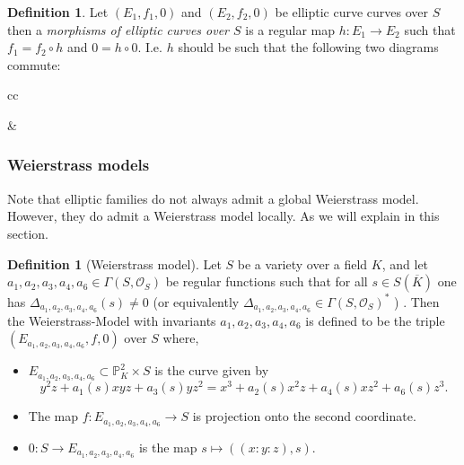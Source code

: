 \documentclass[a4paper,12pt,reqno]{amsart}
\newcommand{\field}[1]{\mathbb{#1}}  %
\renewcommand{\P}{\field{P}}
\theoremstyle{definition}
\newtheorem{definition}[lemma]{Definition}
\numberwithin{lemma}{section}
\numberwithin{equation}{section}
\numberwithin{figure}{section}
\begin{document}
\begin{definition}
Let $(E_1,f_1,0)$ and $(E_2,f_2,0)$ be elliptic curve curves over $S$ then a \textit{morphisms of elliptic curves over $S$} is a regular map $h : E_1 \to E_2$ such that $f_1 = f_2\circ h$ and $0 = h \circ 0$.
I.e. $h$ should be such that the following two diagrams commute:
\begin{center}


\begin{tabular}{cc}	
	&
\end{tabular}
\end{center}

\end{definition}

\subsubsection{Weierstrass models}

Note that elliptic families do not always admit a global Weierstrass model. However, they do admit a Weierstrass model locally. As we will explain in this section.

\begin{definition}[Weierstrass model]\label{def:weierstrass-model-over-var}
Let $S$ be a variety over a field $K$, and let $a_1,a_2,a_3,a_4,a_6 \in \Gamma(S,\mathcal O_S)$ be regular functions such that for all $s \in S(\overline K)$ one has $\Delta_{a_1,a_2,a_3,a_4,a_6}(s) \neq 0$ (or equivalently $\Delta_{a_1,a_2,a_3,a_4,a_6} \in \Gamma(S,\mathcal O_S)^*$ ) . Then the Weierstrass-Model with invariants $a_1,a_2,a_3,a_4,a_6$ is defined to be the triple $(E_{a_1,a_2,a_3,a_4,a_6},f,0)$ over $S$ where, \begin{itemize}[label=-]
	\item $E_{a_1,a_2,a_3,a_4,a_6} \subset \P^2_K \times S$ is the curve given by
	$$y^2z+ a_1(s)xyz+a_3(s)yz^2=x^3+a_2(s)x^2z+a_4(s)xz^2+a_6(s)z^3.$$
	\item The map $f:  E_{a_1,a_2,a_3,a_4,a_6} \to S$ is projection onto the second coordinate.
	\item  $0 : S \to E_{a_1,a_2,a_3,a_4,a_6} $  is the map $s \mapsto ((x:y:z),s)$.
\end{itemize}
\end{definition}
\end{document}
